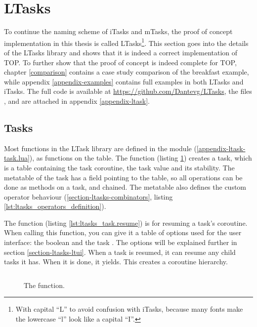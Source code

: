 \section{LTasks}\label{section-ltasks}
To continue the naming scheme of iTasks and mTasks, the proof of concept implementation in this thesis is called LTasks\footnote{With capital ``L'' to avoid confusion with iTasks, because many fonts make the lowercase ``l'' look like a capital ``I''.}. This section goes into the details of the LTasks library and shows that it is indeed a correct implementation of TOP. To further show that the proof of concept is indeed complete for TOP, chapter \ref{comparison} contains a case study comparison of the breakfast example, while appendix \ref{appendix-examples} contains full examples in both LTasks and iTasks. The full code is available at \url{https://github.com/Dantevg/LTasks}, the files ,  and  are attached in appendix \ref{appendix-ltask}.

\subsection{Tasks}
Most functions in the LTask library are defined in the  module (\ref{appendix-ltask-task.lua}), as functions on the  table. The function  (listing \ref{lst:ltasks_task.new}) creates a task, which is a table containing the task coroutine, the task value and its stability. The metatable of the task has a  field pointing to the  table, so all operations can be done as methods on a task, and chained. The metatable also defines the custom operator behaviour (\ref{section-ltasks-combinators}, listing \ref{lst:ltasks_operators_definition}).

The function  (listing \ref{lst:ltasks_task.resume}) is for resuming a task's coroutine. When calling this function, you can give it a table of options used for the user interface: the boolean  and the task . The options will be explained further in section \ref{section-ltasks-ltui}. When a task is resumed, it can resume any child tasks it has. When it is done, it yields. This creates a coroutine hierarchy.


\begin{figure}[ht]
\centering
\inputminted[linenos, firstline=12, lastline=19]{lua}{code/task.lua}
\vspace{-\baselineskip}
\caption{The  function.}
\label{lst:ltasks_task.new}
\end{figure}

